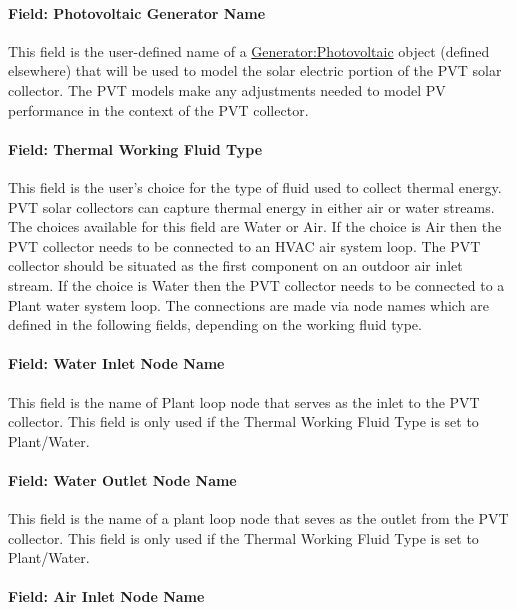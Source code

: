 \paragraph{Field: Photovoltaic Generator Name}\label{field-photovoltaic-generator-name}

This field is the user-defined name of a \hyperref[generatorphotovoltaic-000]{Generator:Photovoltaic} object (defined elsewhere) that will be used to model the solar electric portion of the PVT solar collector. The PVT models make any adjustments needed to model PV performance in the context of the PVT collector.

\paragraph{Field: Thermal Working Fluid Type}\label{field-thermal-working-fluid-type}

This field is the user's choice for the type of fluid used to collect thermal energy. PVT solar collectors can capture thermal energy in either air or water streams. The choices available for this field are Water or Air. If the choice is Air then the PVT collector needs to be connected to an HVAC air system loop. The PVT collector should be situated as the first component on an outdoor air inlet stream. If the choice is Water then the PVT collector needs to be connected to a Plant water system loop. The connections are made via node names which are defined in the following fields, depending on the working fluid type.

\paragraph{Field: Water Inlet Node Name}\label{field-water-inlet-node-name-003}

This field is the name of Plant loop node that serves as the inlet to the PVT collector. This field is only used if the Thermal Working Fluid Type is set to Plant/Water.

\paragraph{Field: Water Outlet Node Name}\label{field-water-outlet-node-name-002}

This field is the name of a plant loop node that seves as the outlet from the PVT collector. This field is only used if the Thermal Working Fluid Type is set to Plant/Water.

\paragraph{Field: Air Inlet Node Name}\label{field-air-inlet-node-name-006}

